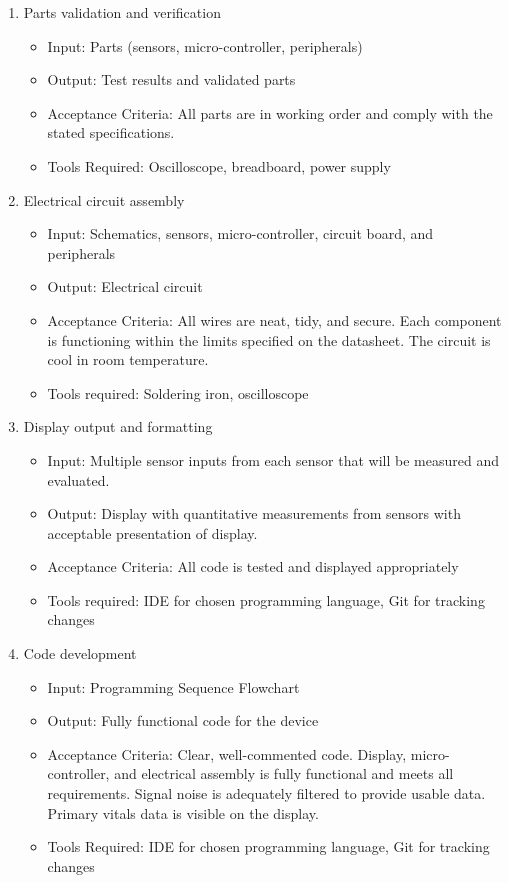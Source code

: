 \documentclass{article}
\begin{document}
\begin{enumerate}
        \item Parts validation and verification
        \begin{itemize}
            \item Input: Parts (sensors, micro-controller, peripherals)
            \item Output: Test results and validated parts
            \item Acceptance Criteria: All parts are in working order and comply with the stated specifications.
            \item Tools Required: Oscilloscope, breadboard, power supply
        \end{itemize}
        
        \item Electrical circuit assembly
        \begin{itemize}
            \item Input: Schematics, sensors, micro-controller, circuit board, and peripherals
            \item Output: Electrical circuit
            \item Acceptance Criteria:  All wires are neat, tidy, and secure.  Each component is functioning within the limits specified on the datasheet. The circuit is cool in room temperature.
            \item Tools required: Soldering iron, oscilloscope 
        \end{itemize}
        
        \item Display output and formatting
        \begin{itemize}
            \item Input: Multiple sensor inputs from each sensor that will be measured and evaluated.
            \item Output: Display with quantitative measurements from sensors with acceptable presentation of display.
            \item Acceptance Criteria:  All code is tested and displayed appropriately
            \item Tools required: IDE for chosen programming language, Git for tracking changes
        \end{itemize}
        
        \item Code development
        \begin{itemize}
            \item Input: Programming Sequence Flowchart
            \item Output: Fully functional code for the device
            \item Acceptance Criteria: Clear, well-commented code. Display, micro-controller, and electrical assembly is fully functional and meets all requirements. Signal noise is adequately filtered to provide usable data.  Primary vitals data is visible on the display. 
            \item Tools Required: IDE for chosen programming language, Git for tracking changes
        \end{itemize}
        

\end{enumerate}
\end{document}
